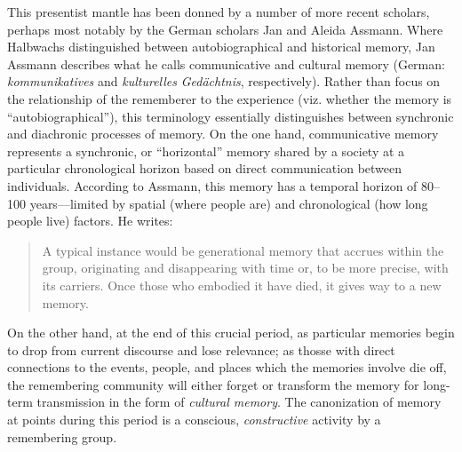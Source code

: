 This presentist mantle has been donned by a number of more recent
scholars, perhaps most notably by the German scholars Jan and Aleida
Assmann.\autocites[See
esp.][]{assmann_nikulin2015}{assmann2011}[and][]{a_assmann2011} Where
Halbwachs distinguished between autobiographical and historical memory,
Jan Assmann describes what he calls communicative and cultural memory
(German: \emph{kommunikatives} and \emph{kulturelles} \emph{Gedächtnis},
respectively).\autocites[36]{assmann2011}[For a concise terminological
crash-course, see][182--183]{hubenthal_carstens-hasselbalch2012} Rather
than focus on the relationship of the rememberer to the experience (viz.
whether the memory is ``autobiographical''), this terminology
essentially distinguishes between synchronic and diachronic processes of
memory. On the one hand, communicative memory represents a synchronic,
or ``horizontal'' memory shared by a society at a particular
chronological horizon based on direct communication between individuals.
According to Assmann, this memory has a temporal horizon of 80--100
years---limited by spatial (where people are) and chronological (how
long people live) factors. He writes:

\begin{quote}
A typical instance would be generational memory that accrues within the
group, originating and disappearing with time or, to be more precise,
with its carriers. Once those who embodied it have died, it gives way to
a new memory.\autocite[36]{assmann2011}
\end{quote}

On the other hand, at the end of this crucial period, as particular
memories begin to drop from current discourse and lose relevance; as
thosse with direct connections to the events, people, and places which
the memories involve die off, the remembering community will either
forget or transform the memory for long-term transmission in the form of
\emph{cultural memory}. The canonization of memory at points during this
period is a conscious, \emph{constructive} activity by a remembering
group. \autocite[45]{assmann2011}

